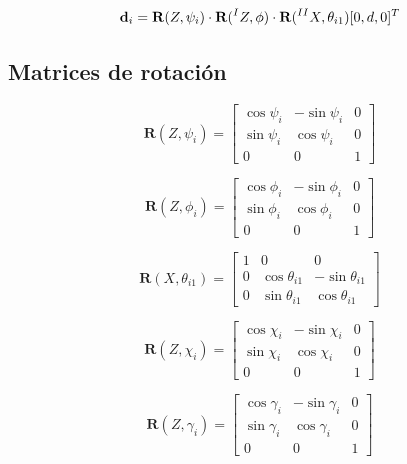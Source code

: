 \documentclass[titlepage, letterpaper, fleqn]{article}
\let\bs\mathbf
\begin{document}
\begin{equation}
    \label{eq:d_vector}
    \bs{d}_i = \bs{R}(Z,\psi_i) \cdot \bs{R}(\prescript{I}{}{Z},\phi) \cdot \bs{R}(\prescript{II}{}{X}, \theta_{i1})[0,d,0]^T
\end{equation}

\subsection{Matrices de rotación} %
\label{subsec:rotations}

\begin{equation}
    \label{eq:rot_Z_psi}
    \bs{R}(Z,\psi_i) =
    \begin{bmatrix}
        \cos\psi_i & -\sin\psi_i & 0 \\
        \sin\psi_i & \cos\psi_i & 0 \\
        0 & 0 & 1
    \end{bmatrix}
\end{equation}

\begin{equation}
    \label{eq:rot_Z_phi}
    \bs{R}(Z,\phi_i) =
    \begin{bmatrix}
        \cos\phi_i & -\sin\phi_i & 0 \\
        \sin\phi_i & \cos\phi_i & 0 \\
        0 & 0 & 1
    \end{bmatrix}
\end{equation}

\begin{equation}
    \label{eq:rot_X_theta}
    \bs{R}(X,\theta_{i1}) =
    \begin{bmatrix}
        1 & 0 & 0 \\
        0 & \cos\theta_{i1} & -\sin\theta_{i1} \\
        0 & \sin\theta_{i1} & \cos\theta_{i1}
    \end{bmatrix}
\end{equation}

\begin{equation}
    \label{eq:rot_Z_chi}
    \bs{R}(Z,\chi_i) =
    \begin{bmatrix}
    \cos\chi_i & -\sin\chi_i & 0 \\
    \sin\chi_i & \cos\chi_i & 0 \\
    0 & 0 & 1
    \end{bmatrix}
\end{equation}

\begin{equation}
    \label{eq:rot_Z_gamma}
    \bs{R}(Z,\gamma_i) = 
    \begin{bmatrix}
    \cos\gamma_i & -\sin\gamma_i & 0 \\
    \sin\gamma_i & \cos\gamma_i & 0 \\
    0 & 0 & 1
    \end{bmatrix}
\end{equation}
\end{document}

